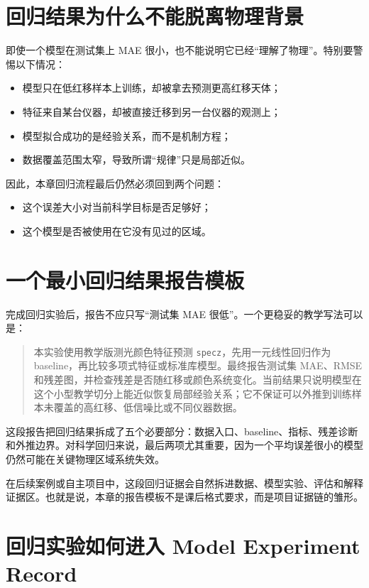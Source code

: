 \section{回归结果为什么不能脱离物理背景}

即使一个模型在测试集上 MAE 很小，也不能说明它已经“理解了物理”。特别要警惕以下情况：

\begin{itemize}
    \item 模型只在低红移样本上训练，却被拿去预测更高红移天体；
    \item 特征来自某台仪器，却被直接迁移到另一台仪器的观测上；
    \item 模型拟合成功的是经验关系，而不是机制方程；
    \item 数据覆盖范围太窄，导致所谓“规律”只是局部近似。
\end{itemize}

因此，本章回归流程最后仍然必须回到两个问题：

\begin{itemize}
    \item 这个误差大小对当前科学目标是否足够好；
    \item 这个模型是否被使用在它没有见过的区域。
\end{itemize}

\section{一个最小回归结果报告模板}

完成回归实验后，报告不应只写“测试集 MAE 很低”。一个更稳妥的教学写法可以是：

\begin{quote}
本实验使用教学版测光颜色特征预测 \texttt{specz}，先用一元线性回归作为 baseline，再比较多项式特征或标准库模型。最终报告测试集 MAE、RMSE 和残差图，并检查残差是否随红移或颜色系统变化。当前结果只说明模型在这个小型教学切分上能近似恢复局部经验关系；它不保证可以外推到训练样本未覆盖的高红移、低信噪比或不同仪器数据。
\end{quote}

这段报告把回归结果拆成了五个必要部分：数据入口、baseline、指标、残差诊断和外推边界。对科学回归来说，最后两项尤其重要，因为一个平均误差很小的模型仍然可能在关键物理区域系统失效。

在后续案例或自主项目中，这段回归证据会自然拆进数据、模型实验、评估和解释证据区。也就是说，本章的报告模板不是课后格式要求，而是项目证据链的雏形。

\section{回归实验如何进入 Model Experiment Record}


